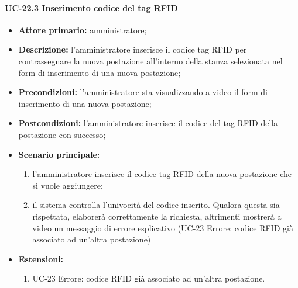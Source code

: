  \paragraph{UC-22.3 Inserimento codice del tag RFID}
 \begin{itemize}
	\item \textbf{Attore primario:} amministratore;
	\item \textbf{Descrizione:} l'amministratore inserisce il codice tag RFID per contrassegnare la nuova postazione all'interno della stanza selezionata nel form di inserimento di una nuova postazione;
	\item \textbf{Precondizioni:} l'amministratore sta visualizzando a video il form di inserimento di una nuova postazione;
	\item \textbf{Postcondizioni:} l'amministratore inserisce il codice del tag RFID della postazione con successo;
	\item \textbf{Scenario principale:}
	      \begin{enumerate}
		      \item l'amministratore inserisce il codice tag RFID della nuova postazione che si vuole aggiungere;
		      \item il sistema controlla l'univocità del codice inserito. Qualora questa sia rispettata, elaborerà correttamente la richiesta, altrimenti mostrerà a video un messaggio di errore esplicativo (UC-23 Errore: codice RFID già associato ad un'altra postazione)
	      \end{enumerate}
	      \item \textbf{Estensioni:}
		\begin{enumerate}
		      \item UC-23 Errore: codice RFID già associato ad un'altra postazione.
	      \end{enumerate}
\end{itemize}

